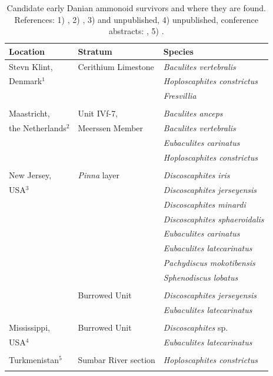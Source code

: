 \documentclass[a4paper]{article}
\begin{document}
\begin{table}
\centering
\begin{tabular}{lll}
Location  & Stratum 	& Species	\\
\hline
Stevn Klint, & Cerithium Limestone & \textit{Baculites vertebralis} \\
Denmark$^{1}$  & & \textit{Hoploscaphites constrictus} \\
 & & \textit{Fresvillia} \\
 & & \\
Maastricht, & Unit IVf-7, & \textit{Baculites anceps} \\
the Netherlands$^{2}$ & Meerssen Member  & \textit{Baculites vertebralis}\\
 & & \textit{Eubaculites carinatus}\\
 & & \textit{Hoploscaphites constrictus}\\
 & & \\
New Jersey, & \textit{Pinna} layer & \textit{Discoscaphites iris} \\
 USA$^{3}$ & & \textit{Discoscaphites jerseyensis} \\
 & & \textit{Discoscaphites minardi} \\
 & & \textit{Discoscaphites sphaeroidalis} \\
 & & \textit{Eubaculites carinatus} \\
 & & \textit{Eubaculites latecarinatus} \\
 & & \textit{Pachydiscus mokotibensis} \\
 & & \textit{Sphenodiscus lobatus} \\
 & & \\
 & Burrowed Unit & \textit{Discoscaphites jerseyensis} \\
 & & \textit{Eubaculites latecarinatus} \\
 & & \\
Mississippi, & Burrowed Unit & \textit{Discoscaphites} sp. \\
USA$^{4}$ & & \textit{Eubaculites latecarinatus} \\
 & & \\
Turkmenistan$^{5}$ & Sumbar River section & \textit{Hoploscaphites constrictus} \\
\hline \\
\end{tabular}
\caption{Candidate early Danian ammonoid survivors and where they are found. References: 1) \cite{machalskiEvidenceAmmoniteSurvival2005, machalskiAmmoniteSurvivalCretaceous2025}, 2) \cite{vellekoopTypeMaastrichtianGastropodFaunas2020, jagtAmmonietenUitHet2012,jagt2003early}, 3) \cite{landmanShortTermSurvivalAmmonites2012} and unpublished, 4) unpublished, conference abstracts: \cite{barrera-cuencaAmmoniteJawsCretaceous2024, landmanAmmonitesCretaceousPaleogeneSites2024}, 5) \cite{machalskiTerminalMaastrichtianAmmonites2012}. }
\label{tab_surv}
\end{table}
\end{document}
